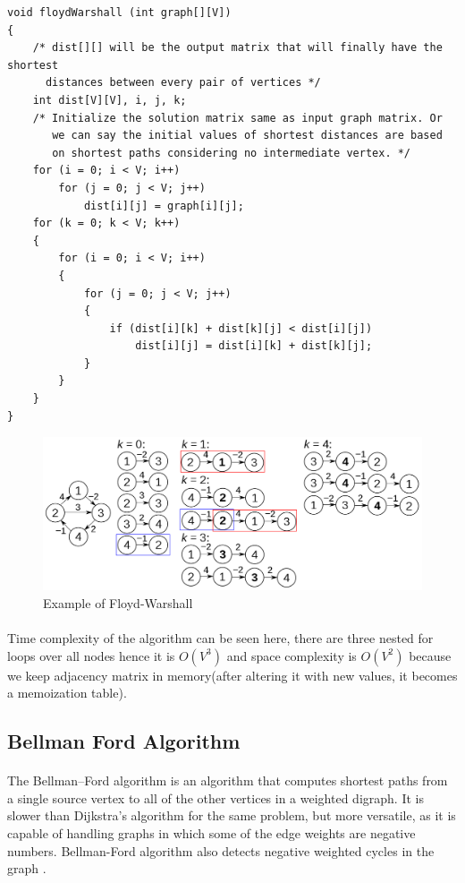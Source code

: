 \documentclass[12pt]{article}
\begin{document}
\begin{verbatim}
void floydWarshall (int graph[][V]) 
{ 
    /* dist[][] will be the output matrix that will finally have the shortest  
      distances between every pair of vertices */
    int dist[V][V], i, j, k; 
    /* Initialize the solution matrix same as input graph matrix. Or  
       we can say the initial values of shortest distances are based 
       on shortest paths considering no intermediate vertex. */
    for (i = 0; i < V; i++) 
        for (j = 0; j < V; j++) 
            dist[i][j] = graph[i][j]; 
    for (k = 0; k < V; k++) 
    { 
        for (i = 0; i < V; i++) 
        { 
            for (j = 0; j < V; j++) 
            { 
                if (dist[i][k] + dist[k][j] < dist[i][j]) 
                    dist[i][j] = dist[i][k] + dist[k][j]; 
            } 
        } 
    } 
} 
\end{verbatim}

\begin{figure}[h!]
\begin{center}
\includegraphics[scale=0.3]{floyd.png}
  \end{center}
\caption{ Example of Floyd-Warshall}
  \label{fig}
\end{figure}

\paragraph{} Time complexity of the algorithm can be seen here, there are three nested for loops over all nodes hence it is $O(V^3)$ and space complexity is $O(V^2)$ because we keep adjacency matrix in memory(after altering it with new values, it becomes a memoization table).

\subsection{Bellman Ford Algorithm}
\paragraph{}
The Bellman–Ford algorithm is an algorithm that computes shortest paths from a single source vertex to all of the other vertices in a weighted digraph. It is slower than Dijkstra's algorithm for the same problem, but more versatile, as it is capable of handling graphs in which some of the edge weights are negative numbers. Bellman-Ford algorithm also detects negative weighted cycles in the graph \cite{9}.
\end{document}
